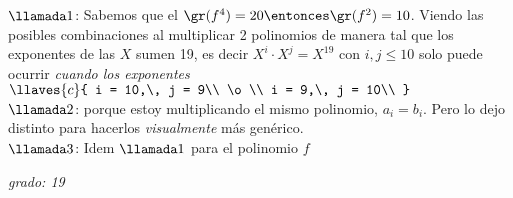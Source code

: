 \begin{enumerate}[label=\roman*)]
        $\llamada1$: Sabemos que el $\gr(f^4) = 20 \entonces \gr(f^2) = 10$. Viendo las posibles combinaciones al multiplicar 2 polinomios
        de manera tal que los exponentes de las $X$ sumen 19, es decir $X^i\cdot X^j = X^{19}$ con $i,j \leq 10$
        solo puede ocurrir \textit{cuando los exponentes}
        $\llaves{c}{
            i = 10,\, j = 9\\
            \o\\
            i = 9,\, j = 10\\
          }$\\

        $\llamada2$: porque estoy multiplicando el mismo polinomio, $a_i = b_i$. Pero lo dejo distinto para hacerlos \textit{visualmente} más genérico.\\

        $\llamada3$: Idem $\llamada1$ para el polinomio $f$

        \textit{grado: 19 }\\
\end{enumerate}
